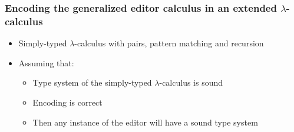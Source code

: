 \documentclass[t,24pt,aspectratio=169]{beamer}
\begin{document}
\begin{frame}[hvid]
    \frametitle{Encoding the generalized editor calculus in an extended $\lambda$-calculus}
    \begin{itemize}
        \item Simply-typed $\lambda$-calculus with pairs, pattern matching and recursion
        \item Assuming that:
              \begin{itemize}
                  \item Type system of the simply-typed $\lambda$-calculus is sound
                  \item Encoding is correct
                  \item Then any instance of the editor will have a sound type system
              \end{itemize}
    \end{itemize}
\end{frame}
\end{document}
